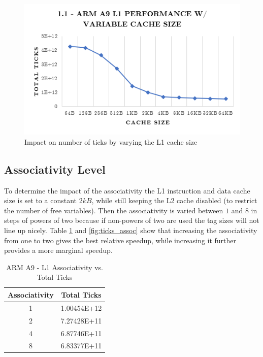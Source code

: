 \documentclass[a4paper, 10pt, conference]{ieeeconf}      %
\begin{document}
\begin{figure}[thpb]
\centering
\includegraphics[scale=.5]{ex1_1.png}
\caption{Impact on number of ticks by varying the L1 cache size}
\label{fig:ex1_1}
\end{figure}

\subsection{Associativity Level}

To determine the impact of the associativity the L1 instruction and data cache size is set to a constant $2kB$, while still keeping the L2 cache disabled (to restrict the number of free variables). Then the associativity is varied between $1$ and $8$ in steps of powers of two because if non-powers of two are used the tag sizes will not line up nicely. Table \ref{tab:ticks_assoc} and \ref{fig:ticks_assoc} show that increasing the associativity from one to two gives the best relative speedup, while increasing it further provides a more marginal speedup.

\begin{table}[h]
\caption{ARM A9 - L1 Associativity vs. Total Ticks}
\label{tab:ticks_assoc}
\begin{center}
\begin{tabular}{|c||c|}
\hline
Associativity & Total Ticks\\
\hline
1 & 1.00454E+12\\
\hline
2 & 7.27428E+11\\
\hline
4 & 6.87746E+11\\
\hline
8 & 6.83377E+11
\\
\hline
\end{tabular}
\end{center}
\end{table}
\end{document}
